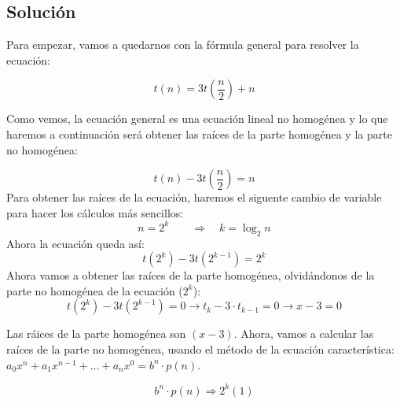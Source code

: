 \documentclass[10pt,a4paper,spanish]{report}
\begin{document}
\subsection{\textcolor[rgb]{0.1,0.2,1}Solución}

\begin{center}
  Para empezar, vamos a quedarnos con la fórmula general para resolver la ecuación:

  \begin{displaymath}
    t(n) = 3t\left(\frac{n}{2}\right) + n
  \end{displaymath}

  Como vemos, la ecuación general es una ecuación lineal no homogénea y lo que haremos a continuación será obtener las raíces de la parte homogénea y la parte no homogénea:

  \begin{displaymath}
    t(n) - 3t\left(\frac{n}{2}\right) = n
  \end{displaymath}
  Para obtener las raíces de la ecuación, haremos el siguente cambio de variable para hacer los cálculos más sencillos:
  \begin{displaymath}
    n = 2^k \qquad \Longrightarrow \quad k = \log_2 n
  \end{displaymath}
  Ahora la ecuación queda así:
  \begin{displaymath}
    t(2^k) - 3t(2^{k-1}) = 2^k
  \end{displaymath}
  Ahora vamos a obtener las raíces de la parte homogénea, olvidándonos de la parte no homogénea de la ecuación ($2^k$):
  \begin{displaymath}
    t(2^k) -3t(2^{k-1}) = 0 \longrightarrow t_k - 3\cdot t_{k-1} = 0 \longrightarrow x - 3 = 0
  \end{displaymath}

  Las ráices de la parte homogénea son $(x-3)$. Ahora, vamos a calcular las raíces de la parte no homogénea, usando el método de la ecuación característica: $a_0x^n + a_1x^{n-1}+\ldots+a_nx^0 = b^n\cdot p(n)$.

  \begin{displaymath}
      b^n\cdot p(n) \Rightarrow 2^k(1)
  \end{displaymath}


\end{center}
\end{document}
